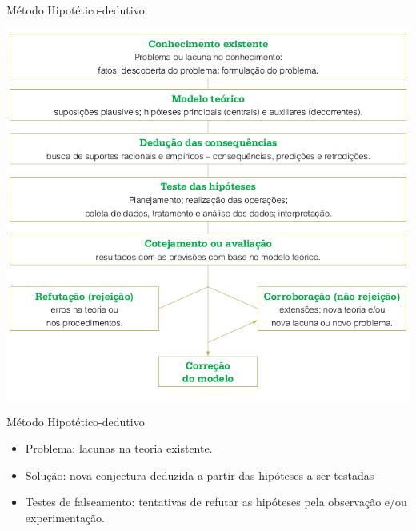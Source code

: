 \documentclass{beamer}
\begin{document}
\begin{frame}{Método Hipotético-dedutivo}
  \begin{center}
    \includegraphics[height=0.95\textheight]{Metodos/metodo_hipotetico}
  \end{center}
\end{frame}

\begin{frame}{Método Hipotético-dedutivo}
  \begin{itemize}
  \item Problema: lacunas na teoria existente.
  \item Solução: nova conjectura deduzida a partir das hipóteses a ser
    testadas
  \item Testes de falseamento: tentativas de refutar as hipóteses pela
    observação e/ou experimentação.
  \end{itemize}
\end{frame}


\end{document}
